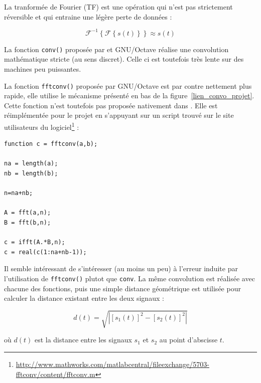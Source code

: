 La tranformée de Fourier (TF) est une opération qui n'est pas strictement réversible et qui entraine une légère perte de
données :

$$\mathcal{F}^{-1}\left\{\mathcal{F}\left\{s(t)\right\}\right\} \approx s(t)$$

La fonction \texttt{conv()} proposée par \matlab et GNU/Octave réalise une convolution mathématique stricte (au sens
discret). Celle ci est toutefois très lente sur des machines peu puissantes.

La fonction \texttt{fftconv()} proposée par GNU/Octave est par contre nettement plus rapide, elle utilise le mécanisme
présenté en bas de la figure~\ref{lien_convo_projet}. Cette fonction n'est toutefois pas proposée nativement dans
\matlab. Elle est réimplémentée pour le projet en s'appuyant sur un script trouvé sur le site utilisateurs du
logiciel\footnote{\url{http://www.mathworks.com/matlabcentral/fileexchange/5703-fftconv/content/fftconv.m}} :

\begin{Verbatim}[samepage=true]
function c = fftconv(a,b);

na = length(a);
nb = length(b);

n=na+nb;

A = fft(a,n);
B = fft(b,n);

c = ifft(A.*B,n);
c = real(c(1:na+nb-1));
\end{Verbatim}

Il semble intéressant de s'intéresser (au moins un peu) à l'erreur induite par l'utilisation de \texttt{fftconv()}
plutot que \texttt{conv}. La même convolution est réalisée avec chacune des fonctions, puis une simple distance
géométrique est utilisée pour calculer la distance existant entre les deux signaux : 

$$ d(t) = \sqrt{\left|\left[s_1(t)\right]^2 - \left[s_2(t)\right]^2\right|}$$

où $d(t)$ est la distance entre les signaux $s_1$ et $s_2$ au point d'abscisse $t$.

